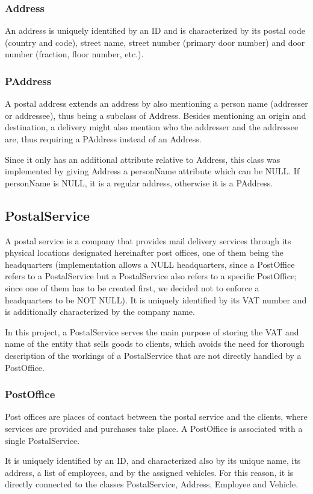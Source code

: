 \documentclass{report}[a4paper]
\theoremstyle{remark}
\begin{document}
\subsubsection{Address}
An address is uniquely identified by an ID and is characterized by its postal code (country and code), street name, street number (primary door number) and door number (fraction, floor number, etc.).
\subsubsection{PAddress}
A postal address extends an address by also mentioning a person name (addresser or addressee), thus being a subclass of Address. Besides mentioning an origin and destination, a delivery might also mention who the addresser and the addressee are, thus requiring a PAddress instead of an Address.\par
Since it only has an additional attribute relative to Address, this class was implemented by giving Address a personName attribute which can be NULL. If personName is NULL, it is a regular address, otherwise it is a PAddress.
\subsection{PostalService}
A postal service is a company that provides mail delivery services through its physical locations designated hereinafter post offices, one of them being the headquarters (implementation allows a NULL headquarters, since a PostOffice refers to a PostalService but a PostalService also refers to a specific PostOffice; since one of them has to be created first, we decided not to enforce a headquarters to be NOT NULL). It is uniquely identified by its VAT number and is additionally characterized by the company name. \par
In this project, a PostalService serves the main purpose of storing the VAT and name of the entity that sells goods to clients, which avoids the need for thorough description of the workings of a PostalService that are not directly handled by a PostOffice.
\subsubsection{PostOffice}
Post offices are places of contact between the postal service and the clients, where services are provided and purchases take place. A PostOffice is associated with a single PostalService.\par
It is uniquely identified by an ID, and characterized also by its unique name, its address, a list of employees, and by the assigned vehicles. For this reason, it is directly connected to the classes PostalService, Address, Employee and Vehicle.
\end{document}
